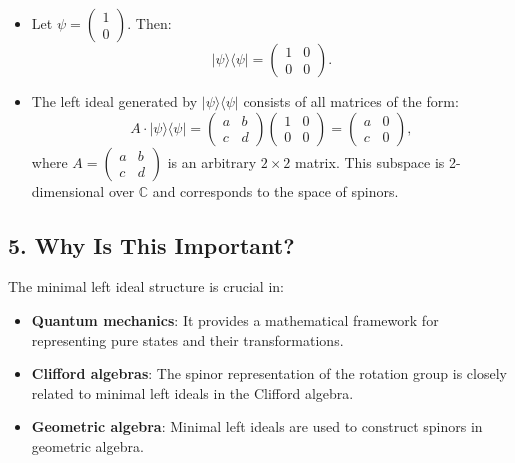 \documentclass{article}
\begin{document}
\begin{itemize}
\item Let $\psi = 
\begin{pmatrix}
1 \\ 
0%
\end{pmatrix}
$. Then:  
\begin{equation*}
|\psi\rangle \langle \psi| = 
\begin{pmatrix}
1 & 0 \\ 
0 & 0%
\end{pmatrix}%
.  
\end{equation*}

\item The left ideal generated by $|\psi\rangle \langle \psi| $ consists of
all matrices of the form:  
\begin{equation*}
A \cdot |\psi\rangle \langle \psi| = 
\begin{pmatrix}
a & b \\ 
c & d%
\end{pmatrix}
\begin{pmatrix}
1 & 0 \\ 
0 & 0%
\end{pmatrix}
= 
\begin{pmatrix}
a & 0 \\ 
c & 0%
\end{pmatrix}%
,  
\end{equation*}
where $A = 
\begin{pmatrix}
a & b \\ 
c & d%
\end{pmatrix}
$ is an arbitrary $2 \times 2 $ matrix. This subspace is 2-dimensional over $%
\mathbb{C} $ and corresponds to the space of spinors.
\end{itemize}

\subsection*{5. Why Is This Important?}

The minimal left ideal structure is crucial in:

\begin{itemize}
\item \textbf{Quantum mechanics}: It provides a mathematical framework for
representing pure states and their transformations. 

\item \textbf{Clifford algebras}: The spinor representation of the rotation
group is closely related to minimal left ideals in the Clifford algebra. 

\item \textbf{Geometric algebra}: Minimal left ideals are used to construct
spinors in geometric algebra.
\end{itemize}
\end{document}
